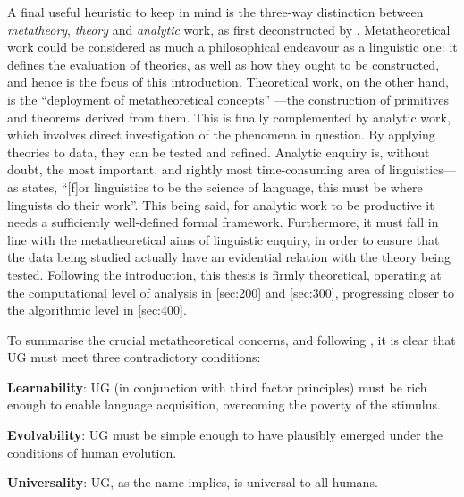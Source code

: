 A final useful heuristic to keep in mind is the three-way distinction between \textit{metatheory}, \textit{theory} and \textit{analytic} work, as first deconstructed by \textcite{ChametzkyRA_1996}. Metatheoretical work could be considered as much a philosophical endeavour as a linguistic one: it defines the evaluation of theories, as well as how they ought to be constructed, and hence is the focus of this introduction. Theoretical work, on the other hand, is the ``deployment of metatheoretical concepts'' \parencite[xviii]{ChametzkyRA_1996}---the construction of primitives and theorems derived from them. This is finally complemented by analytic work, which involves direct investigation of the phenomena in question. By applying theories to data, they can be tested and refined. Analytic enquiry is, without doubt, the most important, and rightly most time-consuming area of linguistics---as \textcite[xviii]{ChametzkyRA_1996} states, ``[f]or linguistics to be the science of language, this must be where linguists do their work''. This being said, for analytic work to be productive it needs a sufficiently well-defined formal framework.  Furthermore, it must fall in line with the metatheoretical aims of linguistic enquiry, in order to ensure that the data being studied actually have an evidential relation with the theory being tested. Following the introduction, this thesis is firmly theoretical, operating at the computational level of analysis in \autoref{sec:200} and \autoref{sec:300}, progressing closer to the algorithmic level in \autoref{sec:400}.

To summarise the crucial metatheoretical concerns, and following \textcite[7]{ChomskyN_2021}, it is clear that UG must meet three contradictory conditions:

\begin{subexamples}
    \item\label{def:learnability} \textbf{Learnability}: UG (in conjunction with third factor principles) must be rich enough to enable language acquisition, overcoming the poverty of the stimulus.
    \item\label{def:evolvability} \textbf{Evolvability}: UG must be simple enough to have plausibly emerged under the conditions of human evolution.
    \item\label{def:universality} \textbf{Universality}: UG, as the name implies, is universal to all humans.
\end{subexamples}

